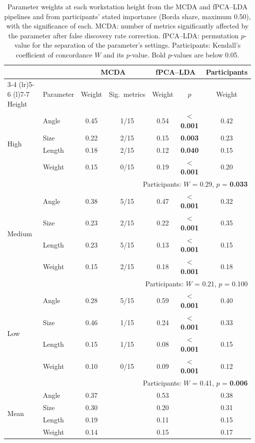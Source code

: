 \begin{table}[htbp]
\centering
\small
\caption{Parameter weights at each workstation height from the MCDA and fPCA--LDA pipelines and from participants' stated importance (Borda share, maximum 0.50), with the significance of each. MCDA: number of metrics significantly affected by the parameter after false discovery rate correction. fPCA--LDA: permutation $p$-value for the separation of the parameter's settings. Participants: Kendall's coefficient of concordance $W$ and its $p$-value. Bold $p$-values are below 0.05.}
\label{tab:stage1_weights}
\begin{tabular}{@{}ll cc cc c@{}}
\toprule
 & & \multicolumn{2}{c}{MCDA} & \multicolumn{2}{c}{fPCA--LDA} & Participants \\
\cmidrule(lr){3-4} \cmidrule(lr){5-6} \cmidrule(l){7-7}
Height & Parameter & Weight & Sig.\ metrics & Weight & $p$ & Weight \\
\midrule
\multirow{4}{*}{High} & Angle & 0.45 & 1/15 & 0.54 & \textbf{$<$0.001} & 0.42 \\
 & Size & 0.22 & 2/15 & 0.15 & \textbf{0.003} & 0.23 \\
 & Length & 0.18 & 2/15 & 0.12 & \textbf{0.040} & 0.15 \\
 & Weight & 0.15 & 0/15 & 0.19 & \textbf{$<$0.001} & 0.20 \\
 & \multicolumn{6}{r}{\footnotesize Participants: $W$ = 0.29, $p$ = \textbf{0.033}} \\
\midrule
\multirow{4}{*}{Medium} & Angle & 0.38 & 5/15 & 0.47 & \textbf{$<$0.001} & 0.32 \\
 & Size & 0.23 & 2/15 & 0.22 & \textbf{$<$0.001} & 0.35 \\
 & Length & 0.23 & 5/15 & 0.13 & \textbf{$<$0.001} & 0.15 \\
 & Weight & 0.15 & 2/15 & 0.18 & \textbf{$<$0.001} & 0.18 \\
 & \multicolumn{6}{r}{\footnotesize Participants: $W$ = 0.21, $p$ = 0.100} \\
\midrule
\multirow{4}{*}{Low} & Angle & 0.28 & 5/15 & 0.59 & \textbf{$<$0.001} & 0.40 \\
 & Size & 0.46 & 1/15 & 0.24 & \textbf{$<$0.001} & 0.33 \\
 & Length & 0.15 & 1/15 & 0.08 & \textbf{$<$0.001} & 0.15 \\
 & Weight & 0.10 & 0/15 & 0.09 & \textbf{$<$0.001} & 0.12 \\
 & \multicolumn{6}{r}{\footnotesize Participants: $W$ = 0.41, $p$ = \textbf{0.006}} \\
\midrule
\multirow{4}{*}{Mean} & Angle & 0.37 & & 0.53 & & 0.38 \\
 & Size & 0.30 & & 0.20 & & 0.31 \\
 & Length & 0.19 & & 0.11 & & 0.15 \\
 & Weight & 0.14 & & 0.15 & & 0.17 \\
\bottomrule
\end{tabular}
\end{table}
